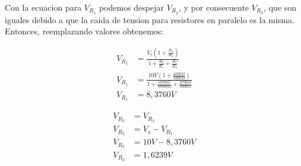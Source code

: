 \documentclass[a4paper,12pt, spanish]{report}
\begin{document}
      Con la ecuacion para $V_{R_1}$ podemos despejar $V_{R_2}$, y por consecuente $V_{R_3}$, que son iguales debido a
      que la caida de tension para resistores en paralelo es la misma. Entonces, reemplazando valores obtenemos:
      \begin{figure}[!h]
        \centering
        \begin{minipage}{0.4\textwidth}
          \begin{align*}
            V_{R_1} &= \frac{V_s \left(1 + \frac{R_2}{R_3}\right)}{1 + \frac{R_2}{R_1} + \frac{R_2}{R_3}}\\
            V_{R_1} &= \frac{10V \left(1 + \frac{4700\Omega}{3300\Omega}\right)}{1 + \frac{4700\Omega}{10000\Omega} + \frac{4700\Omega}{3300\Omega}}\\
            V_{R_1} &= 8,3760V
          \end{align*}
        \end{minipage}
        \centering
        \begin{minipage}{0.4\textwidth}
          \begin{align*}
            V_{R_2} &= V_{R_3}\\
            V_{R_3} &= V_s - V_{R_1}\\
            V_{R_3} &= 10V - 8,3760V\\
            V_{R_3} &= 1,6239V
          \end{align*}
        \end{minipage}
      \end{figure}
\end{document}
